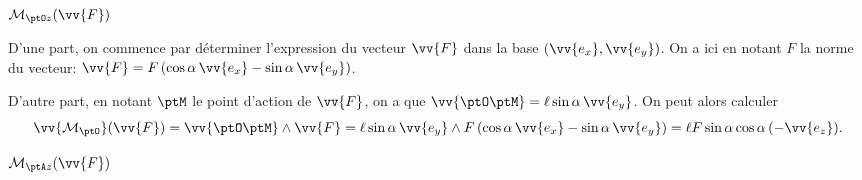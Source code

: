 \debutEntrainement


\begin{enonce}
	$\mathcal{M}_{\ptO z}(\vv{F})$
\end{enonce}


\begin{corrige}
	D'une part, on commence par déterminer l'expression du vecteur $\vv{F}$ dans la base $(\vv{e_x}, \vv{e_y})$. On a ici en notant $F$ la norme du vecteur: $\vv{F} = F\left(\cos\alpha\,\vv{e_x} - \sin\alpha\,\vv{e_y}\right)$. 
	
	D'autre part, en notant $\ptM$ le point d'action de $\vv{F}$, on a que $\vv{\ptO\ptM} = \ell\sin\alpha\,\vv{e_y}$.
	On peut alors calculer
	\[
		\vv{\mathcal{M}_{\ptO}}(\vv{F})
			= \vv{\ptO\ptM} \wedge \vv{F}
			= \ell\sin\alpha\,\vv{e_y} \wedge F\left(\cos\alpha\,\vv{e_x} - \sin\alpha\,\vv{e_y}\right)
			= \ell F\sin\alpha\cos\alpha\,(-\vv{e_z}).
	\]
\end{corrige}



\begin{enonce}
	$\mathcal{M}_{\ptA z}(\vv{F})$
\end{enonce}


\finEntrainement







\hauteurLargeurCadreReponse		{8mm}{2cm}
\typeEntrainement				{} %
\initialisationEntrainement

